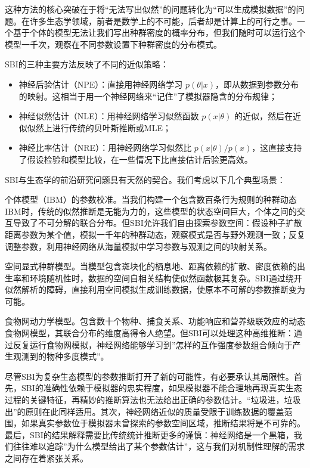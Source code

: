 \documentclass[
  twoside,12pt,fontset=none]{ctexbook}
\providecommand{\tightlist}{%
  \setlength{\itemsep}{0pt}\setlength{\parskip}{0pt}}
\begin{document}
这种方法的核心突破在于将``无法写出似然''的问题转化为``可以生成模拟数据''的问题。在许多生态学领域，前者是数学上的不可能，后者却是计算上的可行之事。一个基于个体的模型无法让我们写出种群密度的概率分布，但我们随时可以运行这个模型一千次，观察在不同参数设置下种群密度的分布模式。

SBI的三种主要方法反映了不同的近似策略：

\begin{itemize}
\tightlist
\item
  神经后验估计（NPE）：直接用神经网络学习 \(p(\theta|x)\)，即从数据到参数分布的映射。这相当于用一个神经网络来``记住''了模拟器隐含的分布规律；
\item
  神经似然估计（NLE）：用神经网络学习似然函数 \(p(x|\theta)\) 的近似，然后在近似似然上进行传统的贝叶斯推断或MLE；
\item
  神经比率估计（NRE）：用神经网络学习似然比 \(p(x|\theta)/p(x)\)，这直接支持了假设检验和模型比较，在一些情况下比直接估计后验更高效。
\end{itemize}

SBI与生态学的前沿研究问题具有天然的契合。我们考虑以下几个典型场景：

个体模型（IBM）的参数校准。当我们构建一个包含数百条行为规则的种群动态IBM时，传统的似然推断是无能为力的，这些模型的状态空间巨大，个体之间的交互导致了不可分解的联合分布。但SBI允许我们自由探索参数空间：假设种子扩散距离参数为某个值，模拟一千年的种群动态，观察模式是否与野外观测一致；反复调整参数，利用神经网络从海量模拟中学习参数与观测之间的映射关系。

空间显式种群模型。当模型包含斑块化的栖息地、距离依赖的扩散、密度依赖的出生率和环境随机性时，数据的空间自相关结构使似然函数极其复杂。SBI通过绕开似然解析的障碍，直接利用空间模拟生成训练数据，使原本不可解的参数推断变为可能。

食物网动力学模型。包含数十个物种、捕食关系、功能响应和营养级联效应的动态食物网模型，其联合分布的维度高得令人绝望。但SBI可以处理这种高维推断：通过反复运行食物网模拟，神经网络能够学习到''怎样的互作强度参数组合倾向于产生观测到的物种多度模式''。

尽管SBI为复杂生态模型的参数推断打开了新的可能性，有必要承认其局限性。首先，SBI的准确性依赖于模拟器的忠实程度，如果模拟器不能合理地再现真实生态过程的关键特征，再精妙的推断算法也无法给出正确的参数估计。``垃圾进，垃圾出''的原则在此同样适用。其次，神经网络近似的质量受限于训练数据的覆盖范围，如果真实参数位于模拟器未曾探索的参数空间区域，推断结果将是不可靠的。最后，SBI的结果解释需要比传统统计推断更多的谨慎：神经网络是一个黑箱，我们往往难以追踪''为什么模型给出了某个参数估计''，这与我们对机制性理解的需求之间存在着紧张关系。
\end{document}
